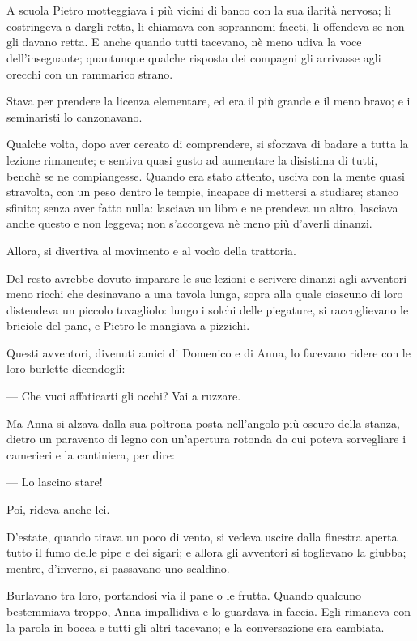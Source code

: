 \chapter{}

A scuola Pietro motteggiava i più vicini di banco con la sua ilarità nervosa; li costringeva a dargli retta, li chiamava con soprannomi faceti, li offendeva se non gli davano retta. E anche quando tutti tacevano, nè meno udiva la voce dell’insegnante; quantunque qualche risposta dei compagni gli arrivasse agli orecchi con un rammarico strano.

Stava per prendere la licenza elementare, ed era il più grande e il meno bravo; e i seminaristi lo canzonavano.

Qualche volta, dopo aver cercato di comprendere, si sforzava di badare a tutta la lezione rimanente; e sentiva quasi gusto ad aumentare la disistima di tutti, benchè se ne compiangesse. Quando era stato attento, usciva con la mente quasi stravolta, con un peso dentro le tempie, incapace di mettersi a studiare; stanco sfinito; senza aver fatto nulla: lasciava un libro e ne prendeva un altro, lasciava anche questo e non leggeva; non s’accorgeva nè meno più d’averli dinanzi.

Allora, si divertiva al movimento e al vocìo della trattoria.

Del resto avrebbe dovuto imparare le sue lezioni e scrivere dinanzi agli avventori meno ricchi che desinavano a una tavola lunga, sopra alla quale ciascuno di loro distendeva un piccolo tovagliolo: lungo i solchi delle piegature, si raccoglievano le briciole del pane, e Pietro le mangiava a pizzichi.

Questi avventori, divenuti amici di Domenico e di Anna, lo facevano ridere con le loro burlette dicendogli:

— Che vuoi affaticarti gli occhi? Vai a ruzzare.

Ma Anna si alzava dalla sua poltrona posta nell’angolo più oscuro della stanza, dietro un paravento di legno con un’apertura rotonda da cui poteva sorvegliare i camerieri e la cantiniera, per dire:

— Lo lascino stare!

Poi, rideva anche lei.

D’estate, quando tirava un poco di vento, si vedeva uscire dalla finestra aperta tutto il fumo delle pipe e dei sigari; e allora gli avventori si toglievano la giubba; mentre, d’inverno, si passavano uno scaldino.

Burlavano tra loro, portandosi via il pane o le frutta. Quando qualcuno bestemmiava troppo, Anna impallidiva e lo guardava in faccia. Egli rimaneva con la parola in bocca e tutti gli altri tacevano; e la conversazione era cambiata.

